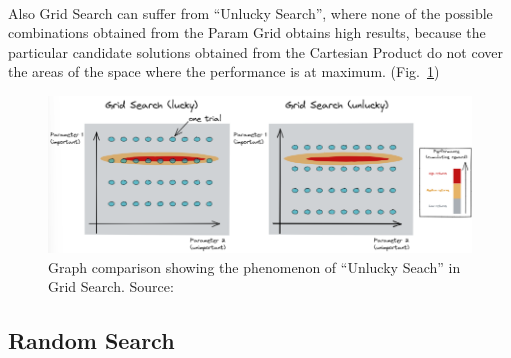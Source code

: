 \\[0.3cm]Also Grid Search can suffer from “Unlucky Search”, where none of the possible combinations obtained from the Param Grid obtains high results, because the particular candidate solutions obtained from the Cartesian Product do not cover the areas of the space where the performance is at maximum. (Fig.~\ref{fig:figure-2.2.3})
\begin{figure}[t]
	\centering
	\includegraphics[width=15cm]{figures/figure-2.2.3.png}
	\caption[Unlucky Search]{Graph comparison showing the phenomenon of “Unlucky Seach” in Grid Search. Source:~\cite{Tesi-1.3}}
	\label{fig:figure-2.2.3}
\end{figure}

\subsection{Random Search}

